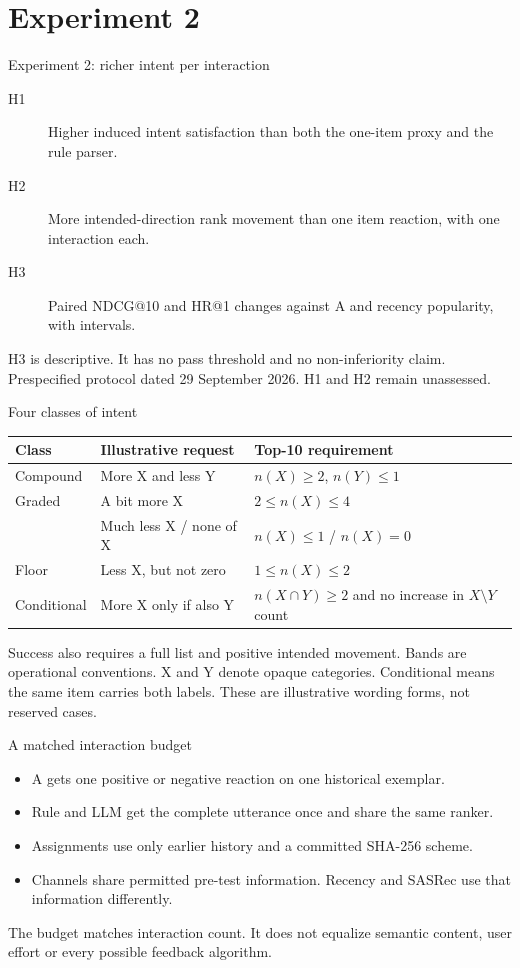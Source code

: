 \documentclass[10pt]{beamer}
\newcommand{\toprule}{\hline}
\newcommand{\midrule}{\hline}
\newcommand{\bottomrule}{\hline}
\newcommand{\src}[1]{\vfill{\tiny\color{bcitgray}#1}}
\begin{document}
\section{Experiment 2}
\begin{frame}{Experiment 2: richer intent per interaction}
\begin{description}
\item[H1] Higher induced intent satisfaction than both the one-item proxy and the rule parser.
\item[H2] More intended-direction rank movement than one item reaction, with one interaction each.
\item[H3] Paired NDCG@10 and HR@1 changes against A and recency popularity, with intervals.
\end{description}
\vspace{0.25cm}
H3 is descriptive. It has no pass threshold and no non-inferiority claim.
\src{Prespecified protocol dated 29 September 2026. H1 and H2 remain unassessed.}
\end{frame}

\begin{frame}{Four classes of intent}
\small
\begin{tabular}{@{}P{2.0cm}P{4.0cm}P{3.7cm}@{}}
\toprule
Class & Illustrative request & Top-10 requirement\\\midrule
Compound & More X and less Y & $n(X)\geq2$, $n(Y)\leq1$\\[0.18cm]
Graded & A bit more X & $2\leq n(X)\leq4$\\
 & Much less X / none of X & $n(X)\leq1$ / $n(X)=0$\\[0.18cm]
Floor & Less X, but not zero & $1\leq n(X)\leq2$\\[0.18cm]
Conditional & More X only if also Y & $n(X\cap Y)\geq2$ and no increase in $X\setminus Y$ count\\\bottomrule
\end{tabular}\par
\vspace{0.25cm}
Success also requires a full list and positive intended movement. Bands are operational conventions.
\src{X and Y denote opaque categories. Conditional means the same item carries both labels. These are illustrative wording forms, not reserved cases.}
\end{frame}

\begin{frame}{A matched interaction budget}
\begin{itemize}
\item A gets one positive or negative reaction on one historical exemplar.
\item Rule and LLM get the complete utterance once and share the same ranker.
\item Assignments use only earlier history and a committed SHA-256 scheme.
\item Channels share permitted pre-test information. Recency and SASRec use that information differently.
\end{itemize}
\vspace{0.3cm}
The budget matches interaction count. It does not equalize semantic content, user effort or every possible feedback algorithm.
\end{frame}
\end{document}
